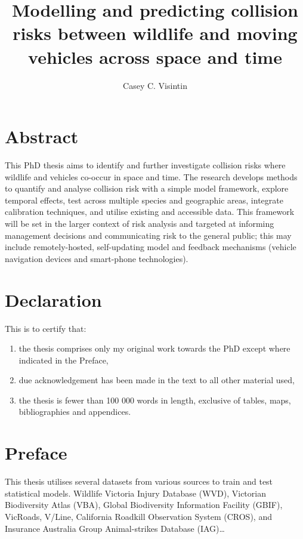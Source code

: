 \documentclass[titlesmallcaps,copyrightpage,examinerscopy]{uomthesis}
\begin{document}
\frontmatter
\title{Modelling and predicting collision risks between wildlife and moving vehicles across space and time}
\author{Casey C. Visintin}

\titlepage

\chapter{Abstract}
This PhD thesis aims to identify and further investigate collision risks where wildlife and vehicles co-occur in space and time.  The research develops methods to quantify and analyse collision risk with a simple model framework, explore temporal effects, test across multiple species and geographic areas, integrate calibration techniques, and utilise existing and accessible data.  This framework will be set in the larger context of risk analysis and targeted at informing management decisions and communicating risk to the general public; this may include remotely-hosted, self-updating model and feedback mechanisms (vehicle navigation devices and smart-phone technologies).

\chapter{Declaration}
This is to certify that:
\begin{enumerate}
 \item the thesis comprises only my original work towards the PhD except where indicated in the Preface,
 \item due acknowledgement has been made in the text to all other material used,
 \item the thesis is fewer than 100 000 words in length, exclusive of tables, maps, bibliographies and appendices.
\end{enumerate}


\chapter{Preface}
This thesis utilises several datasets from various sources to train and test statistical models.  Wildlife Victoria Injury Database (WVD), Victorian Biodiversity Atlas (VBA), Global Biodiversity Information Facility (GBIF), VicRoads, V/Line, California Roadkill Observation System (CROS), and Insurance Australia Group Animal-strikes Database (IAG)\ldots
\end{document}
